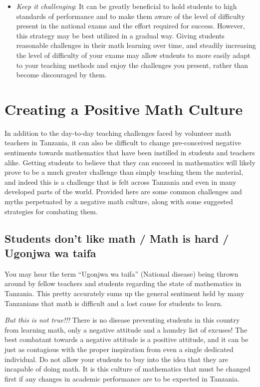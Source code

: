 \begin{itemize}
\item\emph{Keep it challenging}: It can be greatly beneficial to hold students to high standards of performance and to make them aware of the level of difficulty present in the national exams and the effort required for success. However, this strategy may be best utilized in a gradual way. Giving students reasonable challenges in their math learning over time, and steadily increasing the level of difficulty of your exams may allow students to more easily adapt to your teaching methods and enjoy the challenges you present, rather than become discouraged by them. 
\end{itemize}



\section{Creating a Positive Math Culture}
In addition to the day-to-day teaching challenges faced by volunteer math teachers in Tanzania, it can also be difficult to change pre-conceived negative sentiments towards mathematics that have been instilled in students and teachers alike. Getting students to believe that they can succeed in mathematics will likely prove to be a much greater challenge than simply teaching them the material, and indeed this is a challenge that is felt across Tanzania and even in many developed parts of the world. Provided here are some common challenges and myths perpetuated by a negative math culture, along with some suggested strategies for combating them.

\subsection{Students don't like math / Math is hard / Ugonjwa wa taifa}
You may hear the term ``Ugonjwa wa taifa'' (National disease) being thrown around by fellow teachers and students regarding the state of mathematics in Tanzania. This pretty accurately sums up the general sentiment held by many Tanzanians that math is difficult and a lost cause for students to learn.

\emph{But this is not true!!!} There is no disease preventing students in this country from learning math, only a negative attitude and a laundry list of excuses! The best combatant towards a negative attitude is a positive attitude, and it can be just as contagious with the proper inspiration from even a single dedicated individual. Do not allow your students to buy into the idea that they are incapable of doing math. It is this culture of mathematics that must be changed first if any changes in academic performance are to be expected in Tanzania.\\

